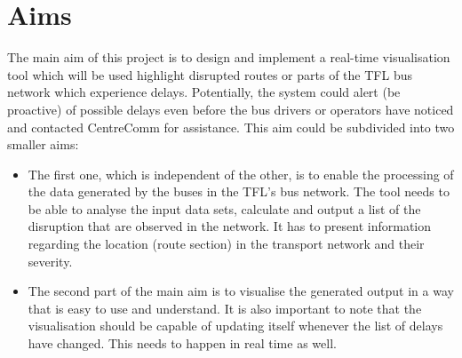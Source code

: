 \section{Aims}
The main aim of this project is to design and implement a real-time visualisation tool which will be used highlight disrupted routes or parts of the TFL bus network which experience delays. Potentially, the system could alert (be proactive) of possible delays even before the bus drivers or operators have noticed and contacted CentreComm for assistance. This aim could be subdivided into two smaller aims:
\begin{itemize}
	\item The first one, which is independent of the other, is to enable the processing of the data generated by the buses in the TFL's bus network. The tool needs to be able to analyse the input data sets, calculate and output a list of the disruption that are observed in the network. It has to present information regarding the location (route section) in the transport network and their severity.
	\item The second part of the main aim is to visualise the generated output in a way that is easy to use and understand. It is also important to note that the visualisation should be capable of updating itself whenever the list of delays have changed. This needs to happen in real time as well.
\end{itemize}

